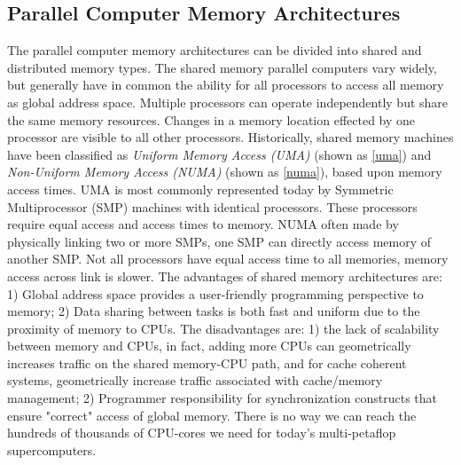 \subsection{Parallel Computer Memory Architectures}

The parallel computer memory architectures can be divided into shared and distributed memory types. The shared memory parallel computers vary widely, but generally have in common the ability for all processors to access all memory as global address space. Multiple processors can operate independently but share the same memory resources. Changes in a memory location effected by one processor are visible to all other processors. Historically, shared memory machines have been classified as \textit{Uniform Memory Access (UMA)} (shown as \ref{uma}) and \textit{Non-Uniform Memory Access (NUMA)} (shown as \ref{numa}), based upon memory access times. UMA is most commonly represented today by Symmetric Multiprocessor (SMP) machines with identical processors. These processors require equal access and access times to memory. NUMA often made by physically linking two or more SMPs, one SMP can directly access memory of another SMP. Not all processors have equal access time to all memories, memory access across link is slower. The advantages of shared memory architectures are: 1) Global address space provides a user-friendly programming perspective to memory; 2) Data sharing between tasks is both fast and uniform due to the proximity of memory to CPUs. The disadvantages are: 1) the lack of scalability between memory and CPUs, in fact, adding more CPUs can geometrically increases traffic on the shared memory-CPU path, and for cache coherent systems, geometrically increase traffic associated with cache/memory management; 2) Programmer responsibility for synchronization constructs that ensure "correct" access of global memory. There is no way we can reach the hundreds of thousands of CPU-cores we need for today’s multi-petaflop supercomputers.

